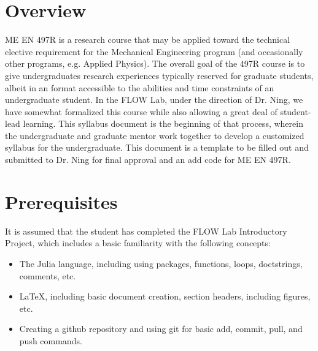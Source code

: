 \documentclass[12pt]{article}
\begin{document}
\section{Overview}
\label{sec:overview}

ME EN 497R is a research course that may be applied toward the technical elective requirement for the Mechanical Engineering program (and occasionally other programs, e.g. Applied Physics).
The overall goal of the 497R course is to give undergraduates research experiences typically reserved for graduate students, albeit in an format accessible to the abilities and time constraints of an undergraduate student.
In the FLOW Lab, under the direction of Dr. Ning, we have somewhat formalized this course while also allowing a great deal of student-lead learning.
This syllabus document is the beginning of that process, wherein the undergraduate and graduate mentor work together to develop a customized syllabus for the undergraduate.
This document is a template to be filled out and submitted to Dr. Ning for final approval and an add code for ME EN 497R.





\section{Prerequisites}
\label{sec:prerequisites}

It is assumed that the student has completed the FLOW Lab Introductory Project, which includes a basic familiarity with the following concepts:

\begin{itemize}
	\item The Julia language, including using packages, functions, loops, doctstrings, comments, etc.
	\item LaTeX, including basic document creation, section headers, including figures, etc.
	\item Creating a github repository and using git for basic add, commit, pull, and push commands.	
\end{itemize}
\end{document}
